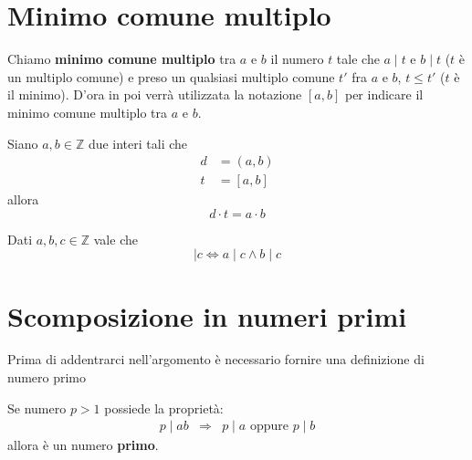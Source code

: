\section{Minimo comune multiplo}

\begin{definition}
	Chiamo \textbf{minimo comune multiplo} tra $a$ e $b$ il numero $t$ tale che $a \mid t$
	e $b \mid t$ ($t$ \`e un multiplo comune) e preso un qualsiasi multiplo comune $t'$ fra
	$a$ e $b$, $t \leq t'$ ($t$ \`e il minimo). D'ora in poi verr\`a utilizzata la notazione
	$[a, b]$ per indicare il minimo comune multiplo tra $a$ e $b$.
\end{definition}

\begin{proposition}
	Siano $a, b \in \mathbb{Z}$ due interi tali che
	\begin{equation*}
		\begin{array}{ll}
			d & = (a, b) \\
			t & = [a, b]
		\end{array}
	\end{equation*}
	allora
	\begin{equation*}
		d \cdot t = a \cdot b
	\end{equation*}
\end{proposition}

\begin{proposition}
	Dati $a, b, c \in \mathbb{Z}$ vale che
	\begin{equation*}
		[a, b] \mid c \Leftrightarrow a \mid c \wedge b \mid c
	\end{equation*}
\end{proposition}

\section{Scomposizione in numeri primi}
Prima di addentrarci nell'argomento \`e necessario fornire una definizione di numero primo

\begin{definition}
	Se numero $p > 1$ possiede la propriet\`a:
	\begin{equation*}
		\begin{array}{rcl}
			p \mid ab & \Rightarrow & p \mid a \text{ oppure } p \mid b
		\end{array}
	\end{equation*}
	allora \`e un numero \textbf{primo}.
\end{definition}

